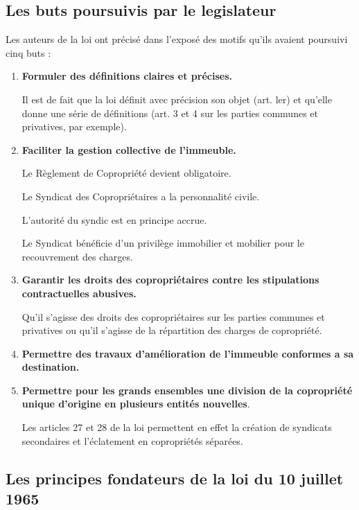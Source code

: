 	\subsection{Les buts poursuivis par le legislateur}
		Les auteurs de la loi ont précisé dans l'exposé des motifs qu'ils avaient poursuivi cinq buts :
		\begin{enumerate}
			\item \textbf{Formuler des définitions claires et précises.}
			
			Il est de fait que la loi définit avec précision son objet (art. ler) et qu'elle donne une série de définitions (art. 3 et 4 sur les parties communes et privatives, par exemple).
			
			\item  \textbf{Faciliter la gestion collective de l'immeuble.}
			
			Le Règlement de Copropriété devient obligatoire.
			
			Le Syndicat des Copropriétaires a la personnalité civile.
			
			L'autorité du syndic est en principe accrue.
			
			Le Syndicat bénéficie d'un privilège immobilier et mobilier pour le recouvrement des charges.
			
			\item  \textbf{Garantir les droits des copropriétaires contre les stipulations contractuelles abusives.}
			
			Qu'il s'agisse des droits des copropriétaires sur les parties communes et privatives ou qu'il s'agisse de la répartition des charges de copropriété.
			
			\item  \textbf{Permettre des travaux d'amélioration de l'immeuble conformes a sa destination.}
			
			\item  \textbf{Permettre pour les grands ensembles une division de la copropriété unique d'origine en plusieurs entités nouvelles}.
			
			Les articles 27 et 28 de la loi permettent en effet la création de syndicats secondaires et l'éclatement en copropriétés séparées.
		\end{enumerate}
	
	\subsection{Les principes fondateurs de la loi du 10 juillet 1965}
	
